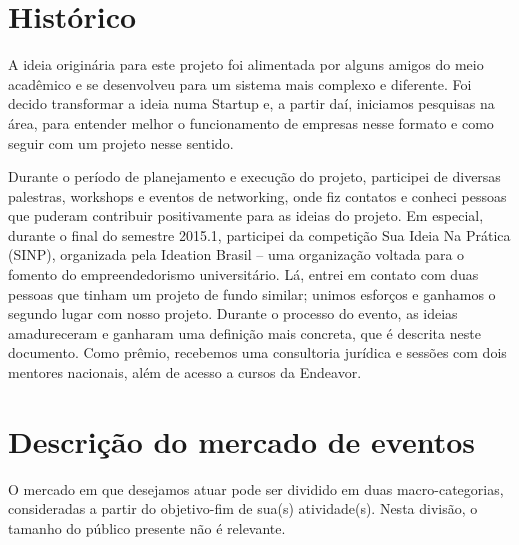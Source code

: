 \documentclass[12pt,a4paper,twoside,hyphens,english,brazil]{abntex2}
\begin{document}

\section{Histórico}
A ideia originária para este projeto foi alimentada por alguns amigos do meio acadêmico e se desenvolveu para um sistema mais complexo e diferente. Foi decido transformar a ideia numa Startup\footnotemark{} e, a partir daí, iniciamos pesquisas na área, para entender melhor o funcionamento de empresas nesse formato e como seguir com um projeto nesse sentido.

Durante o período de planejamento e execução do projeto, participei de diversas palestras, workshops\cite{workshop-startup} e eventos de networking, onde fiz contatos e conheci pessoas que puderam contribuir positivamente para as ideias do projeto. Em especial, durante o final do semestre 2015.1, participei da competição Sua Ideia Na Prática (SINP), organizada pela Ideation Brasil\cite{sinp-2015.1} -- uma organização voltada para o fomento do empreendedorismo universitário. Lá, entrei em contato com duas pessoas que tinham um projeto de fundo similar; unimos esforços e ganhamos o segundo lugar com nosso projeto. Durante o processo do evento, as ideias amadureceram e ganharam uma definição mais concreta, que é descrita neste documento. Como prêmio, recebemos uma consultoria jurídica e sessões com dois mentores nacionais, além de acesso a cursos da Endeavor.


\section{Descrição do mercado de eventos}
O mercado em que desejamos atuar pode ser dividido em duas macro-categorias, consideradas a partir do objetivo-fim de sua(s) atividade(s). Nesta divisão, o tamanho do público presente não é relevante. %
\end{document}
